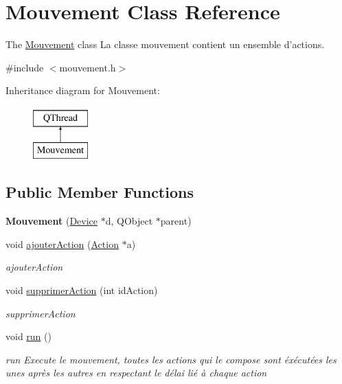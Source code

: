 \hypertarget{classMouvement}{\section{Mouvement Class Reference}
\label{classMouvement}
}


The \hyperlink{classMouvement}{Mouvement} class La classe mouvement contient un ensemble d'actions.  




{\ttfamily \#include $<$mouvement.\-h$>$}

Inheritance diagram for Mouvement\-:\begin{figure}[H]
\begin{center}
\leavevmode
\includegraphics[height=2.000000cm]{classMouvement}
\end{center}
\end{figure}
\subsection*{Public Member Functions}
\begin{DoxyCompactItemize}
\item 
\hypertarget{classMouvement_ac8c8eb03f052b7c87acd6c8bb58d8d9f}{{\bfseries Mouvement} (\hyperlink{classDevice}{Device} $\ast$d, Q\-Object $\ast$parent)}\label{classMouvement_ac8c8eb03f052b7c87acd6c8bb58d8d9f}

\item 
void \hyperlink{classMouvement_ab2a86d3b0e1442b9cf8d1eb635ae6fe7}{ajouter\-Action} (\hyperlink{classAction}{Action} $\ast$a)
\begin{DoxyCompactList}\small\item\em ajouter\-Action \end{DoxyCompactList}\item 
void \hyperlink{classMouvement_a625b3ae43debd9411635398ce1ca17c3}{supprimer\-Action} (int id\-Action)
\begin{DoxyCompactList}\small\item\em supprimer\-Action \end{DoxyCompactList}\item 
\hypertarget{classMouvement_a00406ae24f6814b7f7ebe4601b32e1ee}{void \hyperlink{classMouvement_a00406ae24f6814b7f7ebe4601b32e1ee}{run} ()}\label{classMouvement_a00406ae24f6814b7f7ebe4601b32e1ee}

\begin{DoxyCompactList}\small\item\em run Execute le mouvement, toutes les actions qui le compose sont éxécutées les unes après les autres en respectant le délai lié à chaque action \end{DoxyCompactList}\end{DoxyCompactItemize}


